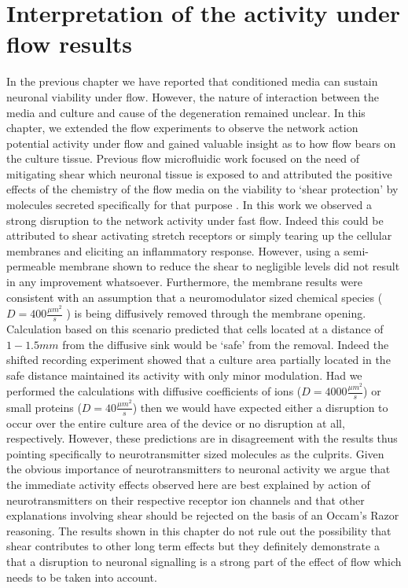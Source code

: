 \section{Interpretation of the activity under flow results}
\label{sec:crossFlow:interp}
In the previous chapter we have reported that conditioned media can sustain neuronal viability under flow. However, the nature of interaction between the media and culture and cause of the degeneration remained unclear. In this chapter, we extended the flow experiments to observe the network action potential activity under flow and gained valuable insight as to how flow bears on the culture tissue. Previous flow microfluidic work focused on the need of mitigating shear \cite{morel2012amplification,wang2008microfluidics} which neuronal tissue is exposed to and attributed the positive effects of the chemistry of the flow media on the viability to `shear protection' by molecules secreted specifically for that purpose \cite{liu2013galanin}. In this work we observed a strong disruption to the network activity under fast flow. Indeed this could be attributed to shear activating stretch receptors or simply tearing up the cellular membranes and eliciting an inflammatory response. However, using a semi-permeable membrane shown to reduce the shear to negligible levels \cite{morel2012concentration} did not result in any improvement whatsoever. Furthermore, the membrane results were consistent with an assumption that a neuromodulator sized chemical species (\(D=400\frac{\mu m^{2}}{s}\) \cite{johnstoneThesis}) is being diffusively removed through the membrane opening. Calculation based on this scenario predicted that cells located at a distance of \(1-1.5 mm\) from the diffusive sink would be `safe' from the removal. Indeed the shifted recording experiment showed that a culture area partially located in the safe distance maintained its activity with only minor modulation. Had we performed the calculations with diffusive coefficients of ions (\(D=4000\frac{\mu m^{2}}{s}\)) or small proteins  (\(D=40\frac{\mu m^{2}}{s}\)) then we would have expected either a disruption to occur over the entire culture area of the device or no disruption at all, respectively. However, these predictions are in disagreement with the results thus pointing specifically to neurotransmitter sized molecules as the culprits. Given the obvious importance of neurotransmitters to neuronal activity we argue that the immediate activity effects observed here are best explained by action of neurotransmitters on their respective receptor ion channels and that other explanations involving shear should be rejected on the basis of an Occam's Razor reasoning. The results shown in this chapter do not rule out the possibility that shear contributes to other long term effects but they definitely demonstrate a that a disruption to neuronal signalling is a strong part of the effect of flow which  needs to be taken into account.

